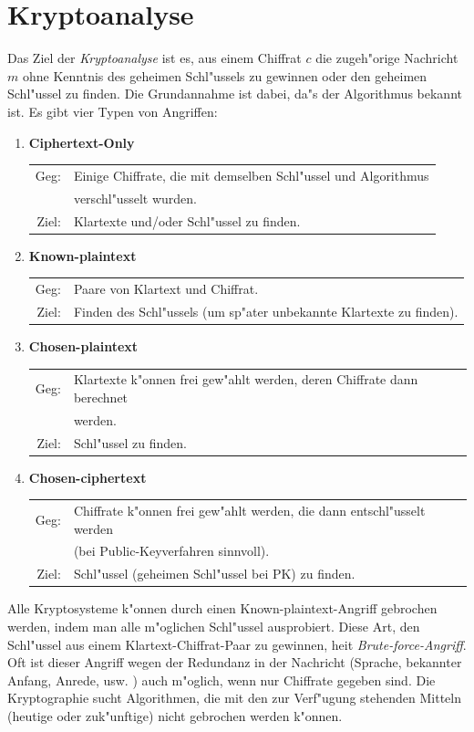 \section*{Kryptoanalyse}

Das Ziel der {\em Kryptoanalyse} ist es, aus einem Chiffrat $c$ die zugeh"orige Nachricht $m$ 
ohne Kenntnis des geheimen Schl"ussels zu gewinnen oder den geheimen
Schl"ussel zu finden. Die Grundannahme ist dabei, 
da"s der Algorithmus bekannt ist. Es gibt vier Typen von Angriffen:
\begin{enumerate}
  \item{\bf Ciphertext-Only} \\
   \begin{tabular}{rl}
     Geg:  & Einige Chiffrate, die mit demselben Schl"ussel und Algorithmus \\
           & verschl"usselt wurden. \\
     Ziel: & Klartexte und/oder Schl"ussel zu finden.
   \end{tabular}
  \item{\bf Known-plaintext} \\
   \begin{tabular}{rl}
     Geg:  & Paare von Klartext und Chiffrat. \\
     Ziel: & Finden des Schl"ussels (um sp"ater unbekannte Klartexte zu finden).\\
   \end{tabular}
  \item{\bf Chosen-plaintext} \\
   \begin{tabular}{rl}
     Geg:  & Klartexte k"onnen frei gew"ahlt werden, deren Chiffrate dann berechnet\\
           & werden. \\
     Ziel: & Schl"ussel zu finden.
   \end{tabular}
  \item{\bf Chosen-ciphertext} \\
   \begin{tabular}{rl}
     Geg:  & Chiffrate k"onnen frei gew"ahlt werden, die dann entschl"usselt werden\\ 
           & (bei Public-Keyverfahren sinnvoll). \\
     Ziel: & Schl"ussel (geheimen Schl"ussel bei PK) zu finden.
   \end{tabular}
\end{enumerate} 
Alle Kryptosysteme k"onnen durch einen Known-plaintext-Angriff gebrochen werden, 
indem man alle m"oglichen Schl"ussel ausprobiert. Diese Art, den Schl"ussel aus einem
Klartext-Chiffrat-Paar zu gewinnen, hei\3t {\em Brute-force-Angriff}. Oft ist dieser 
Angriff wegen der Redundanz in der Nachricht (Sprache, bekannter Anfang, Anrede, usw. ) auch
m"oglich, wenn nur Chiffrate gegeben sind. Die Kryptographie sucht Algorithmen, die mit den zur 
Verf"ugung stehenden Mitteln (heutige oder zuk"unftige) nicht gebrochen werden k"onnen.

